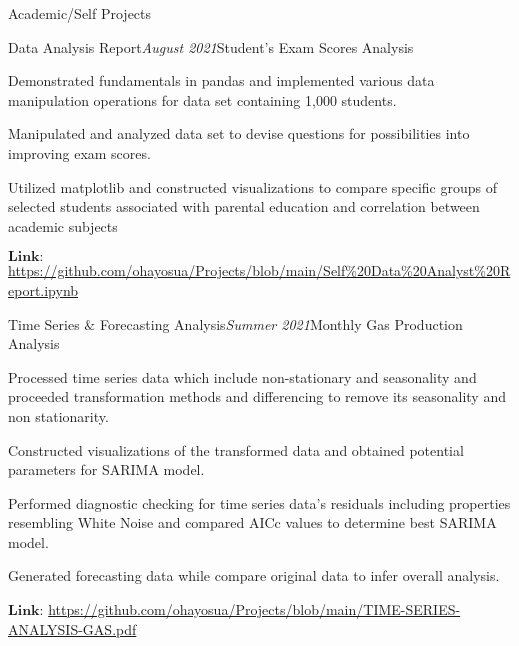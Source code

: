 \documentclass{resume} %
\begin{document}
\begin{rSection}{Academic/Self Projects}


\begin{rSubsection}{Data Analysis Report}{\em August 2021}{Student's Exam Scores Analysis}{}
\item Demonstrated fundamentals in pandas and implemented various data manipulation operations for data set containing 1,000 students.
\item Manipulated and analyzed data set to devise questions for possibilities into improving exam scores.
\item Utilized matplotlib and constructed visualizations to compare specific groups of selected students associated with parental education and correlation between academic subjects
\item $\textbf{Link:}$
\url{https://github.com/ohayosua/Projects/blob/main/Self\%20Data\%20Analyst\%20Report.ipynb}
\end{rSubsection}


\begin{rSubsection}{Time Series $\textbf{\&}$ Forecasting Analysis}{\em Summer 2021}{Monthly Gas Production Analysis}{}
\item Processed time series data which include non-stationary and seasonality and proceeded transformation methods and differencing to remove its seasonality and non stationarity. 
\item Constructed visualizations of the transformed data and obtained potential parameters for SARIMA model.
\item Performed diagnostic checking for time series data's residuals including properties resembling White Noise and compared AICc values to determine best SARIMA model.
\item Generated forecasting data while compare original data to infer overall analysis. 
\item $\textbf{Link:}$ \url{https://github.com/ohayosua/Projects/blob/main/TIME-SERIES-ANALYSIS-GAS.pdf}
\end{rSubsection}

\end{rSection}



\end{document}
